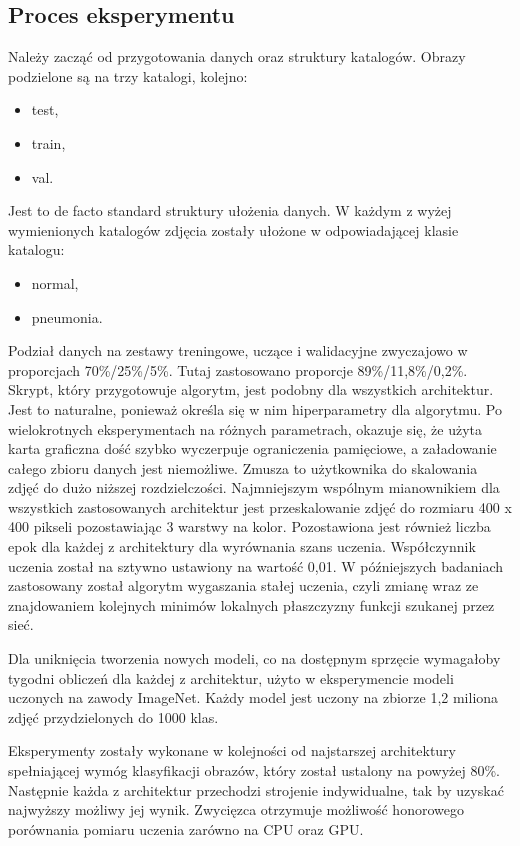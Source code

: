 \documentclass[12pt,a4paper,twoside,titlepage,openright]{book}
\begin{document}
\begin{itemize}
\section{Proces eksperymentu}
Należy zacząć od przygotowania danych oraz struktury katalogów. Obrazy podzielone są na trzy katalogi, kolejno:
\begin{itemize}
\item test,
\item train,
\item val.
\end{itemize}

Jest to de facto standard struktury ułożenia danych. W każdym z wyżej wymienionych katalogów zdjęcia zostały ułożone w odpowiadającej klasie katalogu:
\begin{itemize}
\item normal,
\item pneumonia.
\end{itemize}

Podział danych na zestawy treningowe, uczące i walidacyjne zwyczajowo w proporcjach 70\%/25\%/5\%. Tutaj zastosowano proporcje 89\%/11,8\%/0,2\%.
Skrypt, który przygotowuje algorytm, jest podobny dla wszystkich architektur. Jest to naturalne, ponieważ określa się w nim hiperparametry dla algorytmu. Po wielokrotnych eksperymentach na różnych parametrach, okazuje się, że użyta karta graficzna dość szybko wyczerpuje ograniczenia pamięciowe, a załadowanie całego zbioru danych jest niemożliwe. Zmusza to użytkownika do skalowania zdjęć do dużo niższej rozdzielczości. Najmniejszym wspólnym mianownikiem dla wszystkich zastosowanych architektur jest przeskalowanie zdjęć do rozmiaru 400 x 400 pikseli pozostawiając 3 warstwy na kolor. Pozostawiona jest również liczba epok dla każdej z architektury dla wyrównania szans uczenia. Współczynnik uczenia został na sztywno ustawiony na wartość 0,01. W późniejszych badaniach zastosowany został algorytm wygaszania stałej uczenia, czyli zmianę wraz ze znajdowaniem kolejnych minimów lokalnych płaszczyzny funkcji szukanej przez sieć.

Dla uniknięcia tworzenia nowych modeli, co na dostępnym sprzęcie wymagałoby tygodni obliczeń dla każdej z architektur, użyto w eksperymencie modeli uczonych na zawody ImageNet. Każdy model jest uczony na zbiorze 1,2 miliona zdjęć przydzielonych do 1000 klas. 

Eksperymenty zostały wykonane w kolejności od najstarszej architektury spełniającej wymóg klasyfikacji obrazów, który został ustalony na powyżej 80\%. Następnie każda z architektur przechodzi strojenie indywidualne, tak by uzyskać najwyższy możliwy jej wynik. Zwycięzca otrzymuje możliwość honorowego porównania pomiaru uczenia zarówno na CPU oraz GPU.


\end{itemize}
\end{document}
